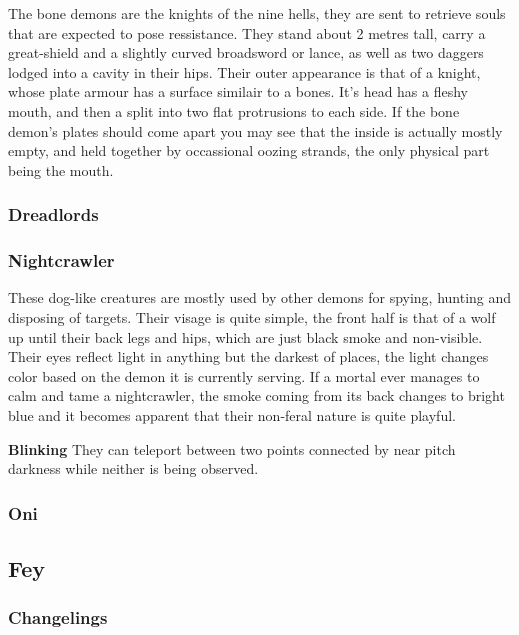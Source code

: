The bone demons are the knights of the nine hells, they are sent to
retrieve souls that are expected to pose ressistance. They stand about 2
metres tall, carry a great-shield and a slightly curved broadsword or
lance, as well as two daggers lodged into a cavity in their hips. Their
outer appearance is that of a knight, whose plate armour has a surface
similair to a bones. It's head has a fleshy mouth, and then a split into
two flat protrusions to each side. If the bone demon's plates should
come apart you may see that the inside is actually mostly empty, and
held together by occassional oozing strands, the only physical part
being the mouth.

\hypertarget{dreadlords}{%
\subsubsection{Dreadlords}\label{dreadlords}}

\hypertarget{nightcrawler}{%
\subsubsection{Nightcrawler}\label{nightcrawler}}

These dog-like creatures are mostly used by other demons for spying,
hunting and disposing of targets. Their visage is quite simple, the
front half is that of a wolf up until their back legs and hips, which
are just black smoke and non-visible. Their eyes reflect light in
anything but the darkest of places, the light changes color based on the
demon it is currently serving. If a mortal ever manages to calm and tame
a nightcrawler, the smoke coming from its back changes to bright blue
and it becomes apparent that their non-feral nature is quite playful.

\textbf{Blinking} They can teleport between two points connected by near
pitch darkness while neither is being observed.

\hypertarget{oni}{%
\subsubsection{Oni}\label{oni}}

\hypertarget{fey}{%
\subsection{Fey}\label{fey}}

\hypertarget{changelings}{%
\subsubsection{Changelings}\label{changelings}}

